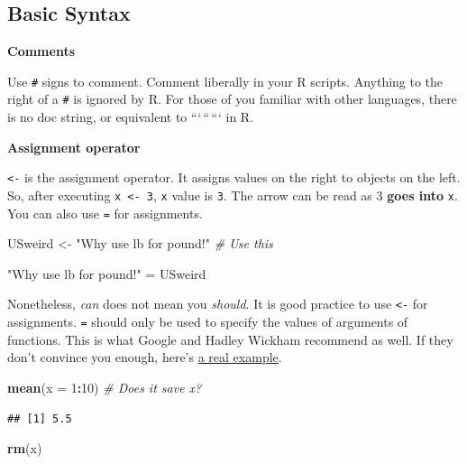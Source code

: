 \documentclass[
]{book}
\newenvironment{Shaded}{\begin{snugshade}}{\end{snugshade}}
\newcommand{\AttributeTok}[1]{\textcolor[rgb]{0.13,0.29,0.53}{#1}}
\newcommand{\CommentTok}[1]{\textcolor[rgb]{0.56,0.35,0.01}{\textit{#1}}}
\newcommand{\DecValTok}[1]{\textcolor[rgb]{0.00,0.00,0.81}{#1}}
\newcommand{\FunctionTok}[1]{\textcolor[rgb]{0.13,0.29,0.53}{\textbf{#1}}}
\newcommand{\NormalTok}[1]{#1}
\newcommand{\OtherTok}[1]{\textcolor[rgb]{0.56,0.35,0.01}{#1}}
\newcommand{\SpecialCharTok}[1]{\textcolor[rgb]{0.81,0.36,0.00}{\textbf{#1}}}
\newcommand{\StringTok}[1]{\textcolor[rgb]{0.31,0.60,0.02}{#1}}
\begin{document}
\subsection{Basic Syntax}\label{basic-syntax}

\textbf{Comments}

Use \texttt{\#} signs to comment. Comment liberally in your R scripts. Anything to the right of a \texttt{\#} is ignored by R. For those of you familiar with other languages, there is no doc string, or equivalent to ```\,``\,``` in R.

\textbf{Assignment operator}

\texttt{\textless{}-} is the assignment operator. It assigns values on the right to objects on the left. So, after executing \texttt{x\ \textless{}-\ 3}, \texttt{x} value is \texttt{3}. The arrow can be read as 3 \textbf{goes into} \texttt{x}. You can also use \texttt{=} for assignments.

\begin{Shaded}
\begin{Highlighting}[]
\NormalTok{USweird }\OtherTok{\textless{}{-}} \StringTok{"Why use lb for pound!"} \CommentTok{\# Use this}

\StringTok{"Why use lb for pound!"} \OtherTok{=}\NormalTok{ USweird}
\end{Highlighting}
\end{Shaded}

Nonetheless, \emph{can} does not mean you \emph{should}. It is good practice to use \texttt{\textless{}-} for assignments. \texttt{=} should only be used to specify the values of arguments of functions. This is what Google and Hadley Wickham recommend as well. If they don't convince you enough, here's \href{https://csgillespie.wordpress.com/2010/11/16/assignment-operators-in-r-vs/}{a real example}.

\begin{Shaded}
\begin{Highlighting}[]
\FunctionTok{mean}\NormalTok{(}\AttributeTok{x =} \DecValTok{1}\SpecialCharTok{:}\DecValTok{10}\NormalTok{) }\CommentTok{\# Does it save x?}
\end{Highlighting}
\end{Shaded}

\begin{verbatim}
## [1] 5.5
\end{verbatim}

\begin{Shaded}
\begin{Highlighting}[]
\FunctionTok{rm}\NormalTok{(x)}
\end{Highlighting}
\end{Shaded}
\end{document}
